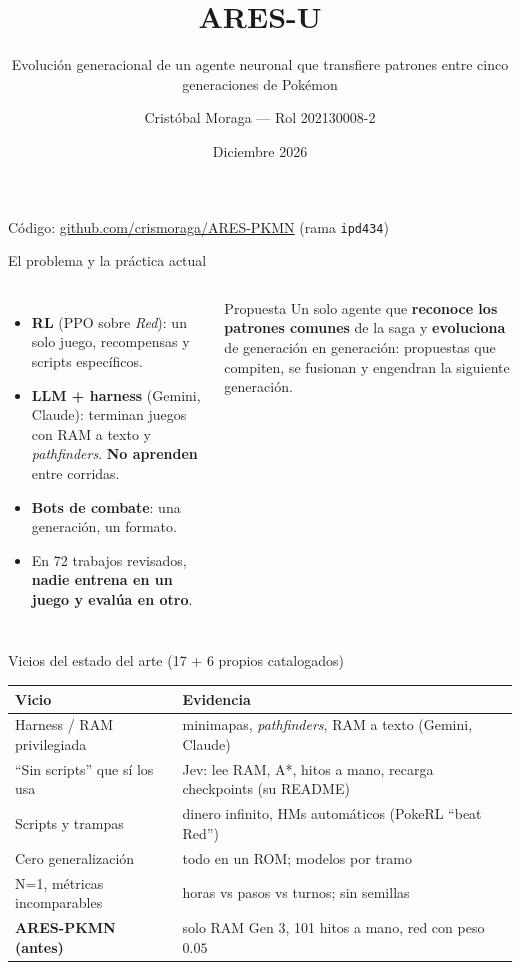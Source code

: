 \documentclass[aspectratio=169,11pt]{beamer}
\title{ARES-U}
\subtitle{Evolución generacional de un agente neuronal que transfiere patrones entre cinco generaciones de Pokémon}
\author{Cristóbal Moraga --- Rol 202130008-2}
\institute{IPD434 Seminario de Soft Computing --- UTFSM}
\date{Diciembre 2026}
\begin{document}
\begin{frame}
\titlepage
\centering\small Código: \url{github.com/crismoraga/ARES-PKMN} (rama \texttt{ipd434})
\end{frame}

\begin{frame}{El problema y la práctica actual}
\begin{columns}[T]
\begin{itemize}
\item \textbf{RL} (PPO sobre \emph{Red}): un solo juego, recompensas y scripts específicos.
\item \textbf{LLM + harness} (Gemini, Claude): terminan juegos con RAM a texto y \emph{pathfinders}. \textbf{No aprenden} entre corridas.
\item \textbf{Bots de combate}: una generación, un formato.
\item En 72 trabajos revisados, \textbf{nadie entrena en un juego y evalúa en otro}.
\end{itemize}
\begin{block}{Propuesta}
Un solo agente que \textbf{reconoce los patrones comunes} de la saga y \textbf{evoluciona} de generación en generación: propuestas que compiten, se fusionan y engendran la siguiente generación.
\end{block}
\end{columns}
\end{frame}

\begin{frame}{Vicios del estado del arte (17 + 6 propios catalogados)}
\small
\begin{tabular}{p{}p{}}
\toprule
Vicio & Evidencia \\
\midrule
Harness / RAM privilegiada & minimapas, \emph{pathfinders}, RAM a texto (Gemini, Claude) \\
``Sin scripts'' que sí los usa & Jev: lee RAM, A*, hitos a mano, recarga checkpoints (su README) \\
Scripts y trampas & dinero infinito, HMs automáticos (PokeRL ``beat Red'') \\
Cero generalización & todo en un ROM; modelos por tramo \\
N=1, métricas incomparables & horas vs pasos vs turnos; sin semillas \\
\midrule
\textbf{ARES-PKMN (antes)} & solo RAM Gen 3, 101 hitos a mano, red con peso $0.05$ \\
\bottomrule
\end{tabular}
\end{frame}
\end{document}
